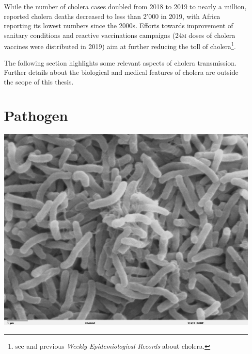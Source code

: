 While the number of cholera cases doubled from 2018 to 2019 to nearly a million, reported cholera deaths decreased to less than 2'000 in 2019, with Africa reporting its lowest numbers since the 2000s. Efforts towards improvement of sanitary conditions and reactive vaccinations campaigns (24\textsc{m} doses of cholera vaccines were distributed in 2019) aim at further reducing the toll of cholera\footnote{see  and previous \textit{Weekly Epidemiological Records} about cholera.}. 

The following section highlights some relevant aspects of cholera transmission. Further details about the biological and medical features of cholera are outside the scope of this thesis.

\section{Pathogen} 
\begin{marginfigure}[6\baselineskip]
\centering
\includegraphics{fig/vibrio}
\label{fig:bacteria}
\end{marginfigure}

